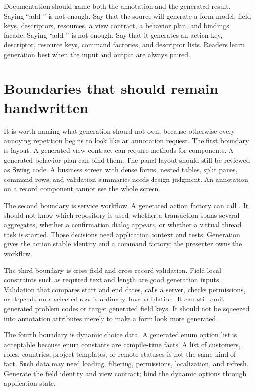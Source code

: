 Documentation should name both the annotation and the generated result. Saying
``add '' is not enough. Say that the source will generate a
form model, field keys, descriptors, resources, a view contract, a behavior
plan, and bindings facade. Saying ``add '' is not enough. Say
that it generates an action key, descriptor, resource keys, command factories,
and descriptor lists. Readers learn generation best when the input and output
are always paired.

\section{Boundaries that should remain handwritten}

It is worth naming what generation should not own, because otherwise every
annoying repetition begins to look like an annotation request. The first
boundary is layout. A generated view contract can require methods for
components. A generated behavior plan can bind them. The panel layout should
still be reviewed as Swing code. A business screen with dense forms, nested
tables, split panes, command rows, and validation summaries needs design
judgment. An annotation on a record component cannot see the whole screen.

The second boundary is service workflow. A generated action factory can call
. It should not know which repository is used, whether a
transaction spans several aggregates, whether a confirmation dialog appears,
or whether a virtual thread task is started. Those decisions need application
context and tests. Generation gives the action stable identity and a command
factory; the presenter owns the workflow.

The third boundary is cross-field and cross-record validation. Field-local
constraints such as required text and length are good generation inputs.
Validation that compares start and end dates, calls a server, checks
permissions, or depends on a selected row is ordinary Java validation. It can
still emit generated problem codes or target generated field keys. It should
not be squeezed into annotation attributes merely to make a form look more
generated.

The fourth boundary is dynamic choice data. A generated enum option list is
acceptable because enum constants are compile-time facts. A list of customers,
roles, countries, project templates, or remote statuses is not the same kind
of fact. Such data may need loading, filtering, permissions, localization, and
refresh. Generate the field identity and view contract; bind the dynamic
options through application state.

